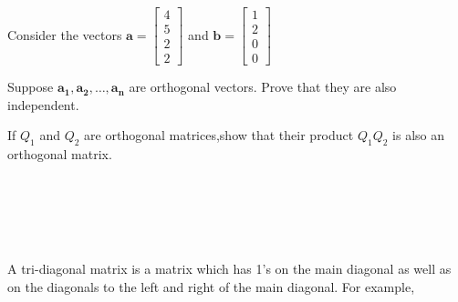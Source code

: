 \documentclass[solution,addpoints,12pt]{exam}
\begin{document}
\begin{questions}
\begin{parts}
\begin{solution}
\end{solution}
\end{parts}


\question[1] Consider the vectors $\mathbf{a} = \begin{bmatrix}4\\5\\2\\2\end{bmatrix}$ and $\mathbf{b} = \begin{bmatrix}1\\2\\0\\0\end{bmatrix}$

\question[1] Suppose $\mathbf{a_1}, \mathbf{a_2}, \dots, \mathbf{a_n}$ are orthogonal vectors. Prove that they are also independent.
\begin{solution}

\end{solution}

\question[1] If $Q_1$ and $Q_2$ are orthogonal matrices,show that their product $Q_1Q_2$ is also an orthogonal matrix. 
\begin{solution}
\\~\\~\\~\\
\end{solution}


\question[2] A tri-diagonal matrix is a matrix which has 1's on the main diagonal as well as on the diagonals to the left and right of the main diagonal. For example, 


\end{questions}
\end{document}
